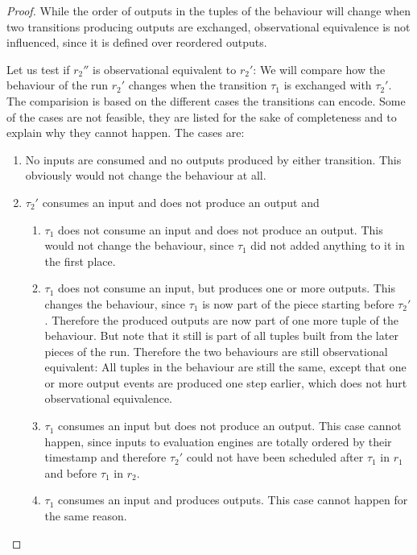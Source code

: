 \begin{proof}
  While the order of outputs in the tuples of the behaviour will change when two transitions producing outputs are exchanged, observational equivalence is not influenced, since it is defined over reordered outputs.

  Let us test if \(r_2''\) is observational equivalent to \(r_2'\):
  We will compare how the behaviour of the run \(r_2'\) changes when the transition \(\tau_1\) is exchanged with \(\tau_2'\).
  The comparision is based on the different cases the transitions can encode.
  Some of the cases are not feasible, they are listed for the sake of completeness and to explain why they cannot happen.
  The cases are:

  \begin{enumerate}
    \item No inputs are consumed and no outputs produced by either transition. This obviously would not change the behaviour at all.
    \item \(\tau_2'\) consumes an input and does not produce an output and
      \begin{enumerate}
        \item \(\tau_1\) does not consume an input and does not produce an output. This would not change the behaviour, since \(\tau_1\) did not added anything to it in the first place.
        \item\label{sec:behaviours:without_timing:greedy:non_greedy_1} \(\tau_1\) does not consume an input, but produces one or more outputs. This changes the behaviour, since \(\tau_1\) is now part of the piece starting before \(\tau_2'\). Therefore the produced outputs are now part of one more tuple of the behaviour. But note that it still is part of all tuples built from the later pieces of the run. Therefore the two behaviours are still observational equivalent: All tuples in the behaviour are still the same, except that one or more output events are produced one step earlier, which does not hurt observational equivalence.
        \item\label{sec:behaviours:without_timing:greedy:impossible_case} \(\tau_1\) consumes an input but does not produce an output. This case cannot happen, since inputs to evaluation engines are totally ordered by their timestamp and therefore \(\tau_2'\) could not have been scheduled after \(\tau_1\) in \(r_1\) and before \(\tau_1\) in \(r_2\).
        \item \(\tau_1\) consumes an input and produces outputs. This case cannot happen for the same reason.
      \end{enumerate}

\end{enumerate}
\end{proof}
